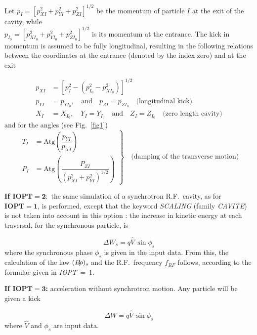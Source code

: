 \noindent Let   $ p_I= \left[p^2_{XI}+p^2_{YI}+p^2_{ZI} \right]^{1/2} $ be the momentum of particle 
$ I $ at the exit of the cavity, while \\ %
$ p_{I_0}= \left[p^2_{XI_0}+p^2_{YI_0} + p^2_{ZI_0}\right]^{1/2} $ is its 
momentum at the entrance. The kick in momentum is assumed to be 
fully longitudinal, resulting in the following relations between 
the coordinates at the entrance (denoted by the index zero) and at the exit 

 \begin{align*}
	 p_{XI} 
	      & = \left[p^2_I-(p^2_{I_0}-p^2_{XI_0}) \right]^{1/2} \\
	p_{YI} & = p_{YI_0},\quad \text{and} \quad  p_{ZI}= p_{ZI_0} \quad\text{(longitudinal  kick)} \\ 
	X_I &  = X_{I_0},\quad Y_I=Y_{I_0}\quad  \text{and} 
	        \quad Z_I=Z_{I_0} \quad\text{(zero  length cavity)}   
 \end{align*}
%
and for the angles (see Fig.~\ref{fig1})  
%
\begin{equation*}
	\left. 
	\begin{aligned}
		T_I & =  \text{Atg} \left( \dfrac{p_{YI}}{ p_{XI}} \right) \\
		P_I &  =  \text{Atg} \left(\dfrac{P_{ZI}}{(p^2_{XI}+p^2_{YI})^{1/2}} \right) 
	\end{aligned}
	 \right\rbrace \quad \text{(damping  of the  transverse  motion)}
\end{equation*}  

\noindent\textbf{If $\mathbf{IOPT  =  2:}$} the same simulation of a synchrotron R.F.\ cavity, 
as for $\mathbf{IOPT  =  1}$, is performed, except that the keyword 
\textsl{SCALING} (family \textsl{CAVITE}) is not taken into 
account in this option : the increase in kinetic energy at each traversal, 
for the synchronous particle, is

$$ \Delta W_s= q\hat  V \,\sin\phi_ s $$
%
where the synchronous phase $ \phi_ s $ is given in the input data.
From this, the calculation of the law $ (B\!\rho )_s $ and the R.F.\ frequency 
$f_{RF} $ follows, according to the formulae given in \mbox{\textsl{IOPT}  =  1}. 
\bigskip

\noindent\textbf{If $\mathbf{IOPT  =  3}$:} acceleration without synchrotron motion. 
Any particle will be given a kick

$$ \Delta W = q\hat  V\, \sin\phi_ s $$
%
where $ \hat  V $ and $ \phi_ s $ are input data.  
\bigskip

